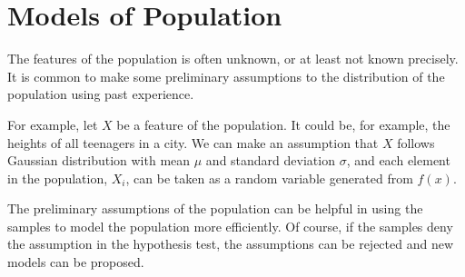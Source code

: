 \section{Models of Population}

The features of the population is often unknown, or at least not known precisely. It is common to make some preliminary assumptions to the distribution of the population using past experience.

For example, let $X$ be a feature of the population. It could be, for example, the heights of all teenagers in a city. We can make an assumption that $X$ follows Gaussian distribution with mean $\mu$ and standard deviation $\sigma$, and each element in the population, $X_i$, can be taken as a random variable generated from $f(x)$.

The preliminary assumptions of the population can be helpful in using the samples to model the population more efficiently. Of course, if the samples deny the assumption in the hypothesis test, the assumptions can be rejected and new models can be proposed.
